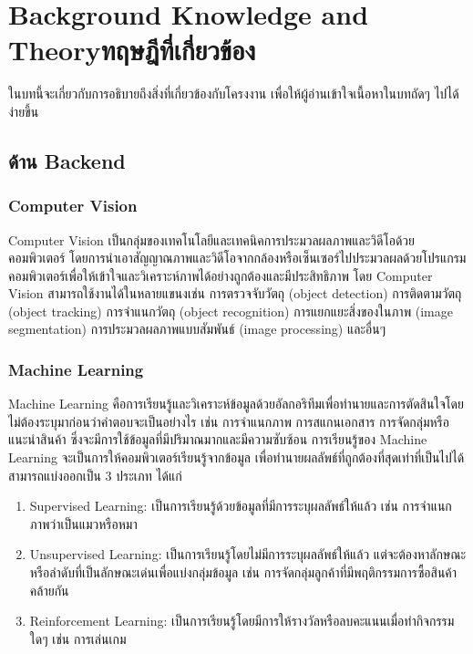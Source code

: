 \chapter{\ifenglish Background Knowledge and Theory\else ทฤษฎีที่เกี่ยวข้อง\fi}

\hspace{10mm} ในบทนี้จะเกี่ยวกับการอธิบายถึงสิ่งที่เกี่ยวข้องกับโครงงาน เพื่อให้ผู้อ่านเข้าใจเนื้อหาในบทถัดๆ ไปได้ง่ายขึ้น

\section{ด้าน Backend}

\subsection{Computer Vision}
Computer Vision เป็นกลุ่มของเทคโนโลยีและเทคนิคการประมวลผลภาพและวิดีโอด้วยคอมพิวเตอร์ โดยการนำเอาสัญญาณภาพและวิดีโอจากกล้องหรือเซ็นเซอร์ไปประมวลผลด้วยโปรแกรมคอมพิวเตอร์เพื่อให้เข้าใจและวิเคราะห์ภาพได้อย่างถูกต้องและมีประสิทธิภาพ
\enskip
โดย Computer Vision สามารถใช้งานได้ในหลายแขนงเช่น การตรวจจับวัตถุ (object detection) การติดตามวัตถุ (object tracking) การจำแนกวัตถุ (object recognition) การแยกแยะสิ่งของในภาพ (image segmentation) การประมวลผลภาพแบบสัมพันธ์ (image processing) และอื่นๆ\cite{Vision}

\subsection{Machine Learning}
Machine Learning คือการเรียนรู้และวิเคราะห์ข้อมูลด้วยอัลกอริทึมเพื่อทำนายและการตัดสินใจโดยไม่ต้องระบุมาก่อนว่าคำตอบจะเป็นอย่างไร
เช่น การจำแนกภาพ การสแกนเอกสาร การจัดกลุ่มหรือแนะนำสินค้า ซึ่งจะมีการใช้ข้อมูลที่มีปริมาณมากและมีความซับซ้อน 
การเรียนรู้ของ Machine Learning จะเป็นการให้คอมพิวเตอร์เรียนรู้จากข้อมูล เพื่อทำนายผลลัพธ์ที่ถูกต้องที่สุดเท่าที่เป็นไปได้ สามารถแบ่งออกเป็น 3 ประเภท ได้แก่
\begin{enumerate}
  \item Supervised Learning: เป็นการเรียนรู้ด้วยข้อมูลที่มีการระบุผลลัพธ์ให้แล้ว เช่น การจำแนกภาพว่าเป็นแมวหรือหมา
  \item Unsupervised Learning: เป็นการเรียนรู้โดยไม่มีการระบุผลลัพธ์ให้แล้ว แต่จะต้องหาลักษณะหรือลำดับที่เป็นลักษณะเด่นเพื่อแบ่งกลุ่มข้อมูล เช่น การจัดกลุ่มลูกค้าที่มีพฤติกรรมการซื้อสินค้าคล้ายกัน
  \item Reinforcement Learning: เป็นการเรียนรู้โดยมีการให้รางวัลหรือลบคะแนนเมื่อทำกิจกรรมใดๆ เช่น การเล่นเกม
\end{enumerate}
\cite{Machine}
